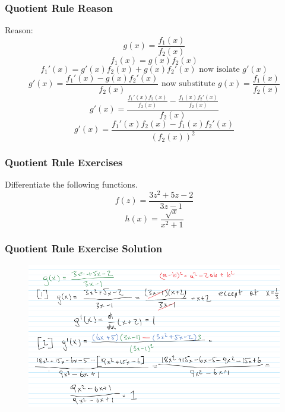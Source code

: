 \documentclass[xcolor=dvipsnames]{beamer}
\begin{document}
\begin{frame}
  \frametitle{Quotient Rule Reason}
Reason:
\begin{equation}
  \label{eq:iebowohc}
g(x)=\frac{f_{1}(x)}{f_{2}(x)}
\end{equation}
\begin{equation}
  \label{eq:iilahthi}
f_{1}(x)=g(x)f_{2}(x)
\end{equation}
\begin{equation}
  \label{eq:eshohhoo}
f_{1}'(x)=g'(x)f_{2}(x)+g(x)f_{2}'(x)\mbox{ now isolate }g'(x)
\end{equation}
\begin{equation}
  \label{eq:iophiewu}
g'(x)=\frac{f_{1}'(x)-g(x)f_{2}'(x)}{f_{2}(x)}\mbox{ now substitute }g(x)=\frac{f_{1}(x)}{f_{2}(x)}
\end{equation}
\begin{equation}
  \label{eq:uhushain}
g'(x)=\frac{\frac{f_{1}'(x)f_{2}(x)}{f_{2}(x)}-\frac{f_{1}(x)f_{2}'(x)}{f_{2}(x)}}{f_{2}(x)}
\end{equation}
\begin{equation}
  \label{eq:requuare}
g'(x)=\frac{f_{1}'(x)f_{2}(x)-f_{1}(x)f_{2}'(x)}{\left(f_{2}(x)\right)^{2}}
\end{equation}
\end{frame}

\begin{frame}
  \frametitle{Quotient Rule Exercises}
{\ubung} Differentiate the following functions.
\begin{equation}
  \label{eq:xookaeji}
f(z)=\frac{3z^{2}+5z-2}{3z-1}
\end{equation}
\begin{equation}
  \label{eq:eidoogow}
h(x)=\frac{\sqrt{x}}{x^{2}+1}
\end{equation}
\end{frame}

\begin{frame}
  \frametitle{Quotient Rule Exercise Solution}
  \begin{figure}[h]
    \includegraphics[scale=0.575]{./onenote_ft_09_ProductQuotientRule_02.png}
  \end{figure}
\end{frame}
\end{document}
